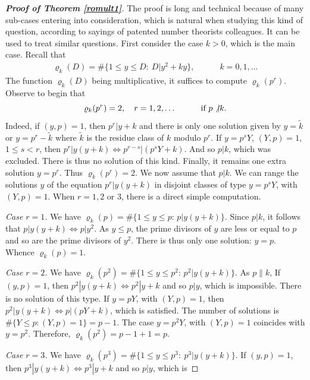 \documentclass[11pt,draft,reqno]{amsart}
\theoremstyle{definition}
\theoremstyle{remarks}
\numberwithin{equation}{section}
\def \qq{{\qquad}}
\begin{document}
\begin{proof}[\bf Proof of Theorem \ref{romult1}] 
The proof is  long and technical because  of many sub-cases entering into consideration, which is natural when studying this kind of question, according to sayings of patented number theorists colleagues. It can be used to treat similar questions. First consider the   case  $k>0$, which is the
main case. Recall that
\begin{eqnarray*}
\varrho_k(D)=\#\big\{1\le y\le  D: \  D| y^2+ky \big\} ,\qq \quad k=0,1,\ldots
\end{eqnarray*} 
The function $\varrho_k(D)$ being multiplicative,
it suffices to compute $\varrho_k(p^r)$. Observe to begin that 
$$\varrho_k(p^r)=2, \quad r=1,2,\ldots\qq\quad \hbox{if $p\not| k$}. $$ 
 Indeed, if $(y,p)=1$, then $p^r|y+k$ and there is only one solution given by
$y= \tilde k$ or $y=p^r-\tilde k$ where $\tilde k$ is the residue class of $k$ modulo $p^r$. If $y=p^s Y$, $(Y,p)=1$, $1\le s<r$, then $p^r| y(y+k)\Leftrightarrow p^{r-s} |(p^sY+k)$. And so $p|k$,
which was excluded. There is thus no solution of this kind. Finally, it remains one extra solution $y=p^r$. Thus $\varrho_k(p^r)=2$.
\vskip 5pt     We now assume that $p|k$. We can range the solutions $y$ of the equation $p^r|y(y+k)$ in disjoint classes of type $y=p^sY$,
with
$(Y,p)=1$. When
$r=1,2$ or
$3$, there is a direct simple computation.  
\smallskip\par   {\it Case $r=1$.}  We have $\varrho_k(p)=\#\big\{1\le y\le p: \,  p| y(y+k)  \big\}$. 
 Since $p |k$, it follows that  $p| y(y+k)\Leftrightarrow p|y^2$. As $y\le p$, the prime divisors of $y$ are less or equal to $p$ and    so are the prime divisors of $y^2$. There is thus only one solution: $y=p$.
Whence $    \varrho_k(p)=1$.
 \smallskip\par    {\it Case $r=2$.}   We have $\varrho_k(p^2)=\#\big\{1\le y\le p^2: \,  p^2| y(y+k)  \big\}
$. As $p\| k$, 
   If $(y,p)=1$, then $p^2| y(y+k)\Leftrightarrow p^2|y+k$ and so $p|y$, which is
impossible. There is no solution of this type. 
 If $y=pY$, with  $(Y,p)=1$, then  $p^2| y(y+k)\Leftrightarrow p|(pY+k)$, which  is satisfied. 
The number of solutions is $\#\{ Y\le p:
(Y,p)=1\}=p-1$. The case $y=p^2Y$, with  $(Y,p)=1$ coincides with $y=p^2$.
 Therefore,  
 $    \varrho_k(p^2)=   p-1+1=p$.
\smallskip\par {\it Case $r=3$.}   We have $\varrho_k(p^3)=\#\big\{1\le y\le p^3: \  p^3| y(y+k)  \big\}. 
$
     If $(y,p)=1$, then $p^3| y(y+k)\Leftrightarrow p^3|y+k$ and so $p|y$, which is

\end{proof}
\end{document}
